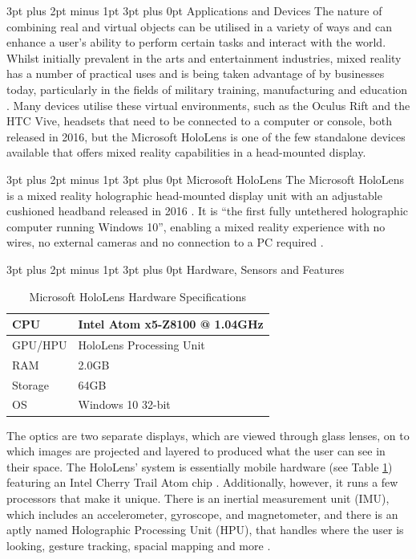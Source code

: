 \documentclass[12pt,a4paper,oneside]{article}
\makeatletter
\renewcommand\subsubsection{\@startsection {subsubsection}{1}{0mm} %
	                           {3pt plus 2pt minus 1pt} %
	                           {3pt plus 0pt} %
	                           {\normalfont\bfseries}}
\renewcommand\subsection{\@startsection {subsection}{1}{0mm} %
                               {3pt plus 2pt minus 1pt} %
                               {3pt plus 0pt} %
                               {\large\bfseries}}
\makeatother
\begin{document}
\subsubsection{Applications and Devices}
The nature of combining real and virtual objects can be utilised in a variety of ways and can enhance a user's ability to perform certain tasks and interact with the world. Whilst initially prevalent in the arts and entertainment industries, mixed reality has a number of practical uses and is being taken advantage of by businesses today, particularly in the fields of military training, manufacturing and education \cite{evans17, hughes97}. Many devices utilise these virtual environments, such as the Oculus Rift and the HTC Vive, headsets that need to be connected to a computer or console, both released in 2016, but the Microsoft HoloLens is one of the few standalone devices available that offers mixed reality capabilities in a head-mounted display.

\subsection{Microsoft HoloLens}
The Microsoft HoloLens is a mixed reality holographic head-mounted display unit with an adjustable cushioned headband released in 2016 \cite{microsoftcorp}. It is ``the first fully untethered holographic computer running Windows 10'', enabling a mixed reality experience with no wires, no external cameras and no connection to a PC required \cite{holmdahl15}.

\subsubsection{Hardware, Sensors and Features}
\begin{table}[!h]
	\renewcommand{\arraystretch}{1.3}
	\caption{Microsoft HoloLens Hardware Specifications}
	\label{hardware}
	\centering
	\begin{tabular}{l|l}
		\toprule
		CPU & Intel Atom x5-Z8100 @ 1.04GHz\\ \hline
		GPU/HPU & HoloLens Processing Unit \\ \hline
		RAM & 2.0GB\\ \hline
		Storage & 64GB\\ \hline
		OS & Windows 10 32-bit\\ \bottomrule
	\end{tabular}
\end{table}
The optics are two separate displays, which are viewed through glass lenses, on to which images are projected and layered to produced what the user can see in their space. The HoloLens' system is essentially mobile hardware (see Table \ref{hardware}) featuring an Intel Cherry Trail Atom chip \cite{rubino16}. Additionally, however, it runs a few processors that make it unique. There is an inertial measurement unit (IMU), which includes an accelerometer, gyroscope, and magnetometer, and there is an aptly named Holographic Processing Unit (HPU), that handles where the user is looking, gesture tracking, spacial mapping and more \cite{holmdahl15}.
\end{document}
